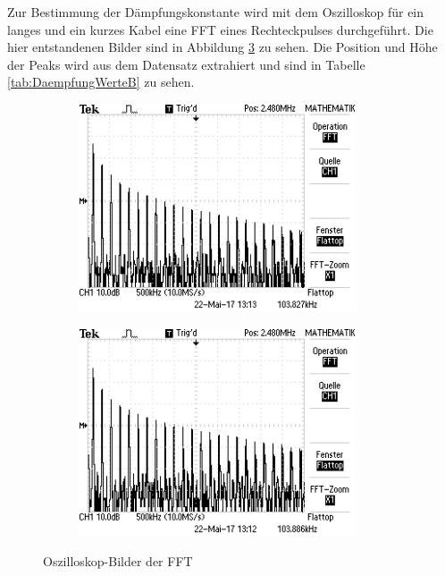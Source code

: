Zur Bestimmung der Dämpfungskonstante wird mit dem Oszilloskop für ein langes und ein kurzes Kabel eine FFT eines Rechteckpulses durchgeführt. Die hier entstandenen Bilder sind in Abbildung \ref{fig:FFT} zu sehen. Die Position und Höhe der Peaks wird aus dem Datensatz extrahiert und sind in Tabelle \ref{tab:DaempfungWerteB} zu sehen. \\
\begin{figure}[h]
	\centering
	\begin{subfigure}{0.495\textwidth}
		\centering
		\includegraphics[width=0.9\textwidth]{Oszilloskop/DaempfungLang/F0042TEK.JPG}
		\label{fig:FFTLang}
	\end{subfigure}
	\begin{subfigure}{0.495\textwidth}
		\centering
		\includegraphics[width=0.9\textwidth]{Oszilloskop/DaempfungKurz/F0041TEK.JPG}
		\label{fig:FFTKurz}
	\end{subfigure}
	\caption{Oszilloskop-Bilder der FFT}
	\label{fig:FFT}
\end{figure}
